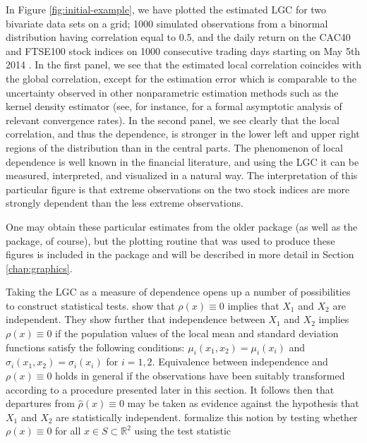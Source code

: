 In Figure \ref{fig:initial-example}, we have plotted the estimated LGC for two bivariate data sets on a grid; 1000 simulated observations from a binormal distribution having correlation equal to 0.5, and the daily return on the CAC40 and FTSE100 stock indices on 1000 consecutive trading days starting on May 5th 2014 \citep{datastream}. In the first panel, we see that the estimated local correlation coincides with the global correlation, except for the estimation error which is comparable to the uncertainty observed in other nonparametric estimation methods such as the kernel density estimator (see, for instance, \citet{otne:tjos:2017} for a formal asymptotic analysis of relevant convergence rates). In the second panel, we see clearly that the local correlation, and thus the dependence, is stronger in the lower left and upper right regions of the distribution than in the central parts. The phenomenon of local dependence is well known in the financial literature, and using the LGC it can be measured, interpreted, and visualized in a natural way. The interpretation of this particular figure is that extreme observations on the two stock indices are more strongly dependent than the less extreme observations. 

One may obtain these particular estimates from the older  package (as well as the  package, of course), but the plotting routine that was used to produce these figures is included in the  package and will be described in more detail in Section \ref{chap:graphics}.

Taking the LGC as a measure of dependence opens up a number of possibilities to construct statistical tests. \citet{bere:tjos:2014} show that $\rho\left(x\right) \equiv 0$ implies that $X_1$ and $X_2$ are independent. They show further that independence between $X_1$ and $X_2$ implies $\rho\left(x\right) \equiv 0$ if the population values of the local mean and standard deviation functions satisfy the following conditions: $\mu_i\left(x_1, x_2\right) = \mu_i\left(x_i\right)$ and $\sigma_i\left(x_1, x_2\right) = \sigma_i\left(x_i\right)$ for $i=1,2$. Equivalence between independence and $\rho\left(x\right) \equiv 0$ holds in general if the observations have been suitably transformed according to a procedure presented later in this section. It follows then that departures from $\widehat\rho\left(x\right) \equiv 0$ may be taken as evidence against the hypothesis that $X_1$ and $X_2$ are statistically independent. \citet{bere:tjos:2014} formalize this notion by testing whether $\rho\left(x\right) \equiv 0$ for all $x\in S \subset \mathbb{R}^2$ using the test statistic

